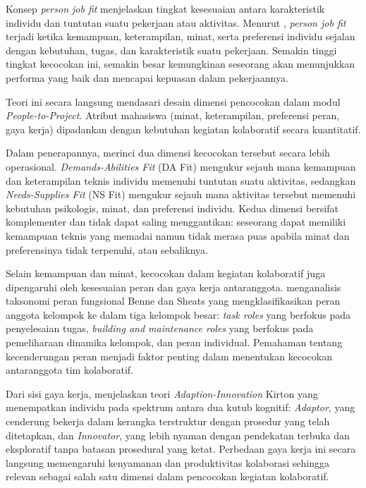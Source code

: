 Konsep \emph{person job fit} menjelaskan tingkat kesesuaian antara karakteristik individu dan tuntutan suatu pekerjaan atau aktivitas. Menurut \textcite{kristofbrown2005}, \emph{person job fit} terjadi ketika kemampuan, keterampilan, minat, serta preferensi individu sejalan dengan kebutuhan, tugas, dan karakteristik suatu pekerjaan. Semakin tinggi tingkat kecocokan ini, semakin besar kemungkinan seseorang akan menunjukkan performa yang baik dan mencapai kepuasan dalam pekerjaannya.

Teori ini secara langsung mendasari desain dimensi pencocokan dalam modul \emph{People-to-Project}. Atribut mahasiswa (minat, keterampilan, preferensi peran, gaya kerja) dipadankan dengan kebutuhan kegiatan kolaboratif secara kuantitatif.

Dalam penerapannya, \textcite{langgeng2021} merinci dua dimensi kecocokan tersebut secara lebih operasional. \emph{Demands-Abilities Fit} (DA Fit) mengukur sejauh mana kemampuan dan keterampilan teknis individu memenuhi tuntutan suatu aktivitas, sedangkan \emph{Needs-Supplies Fit} (NS Fit) mengukur sejauh mana aktivitas tersebut memenuhi kebutuhan psikologis, minat, dan preferensi individu. Kedua dimensi bersifat komplementer dan tidak dapat saling menggantikan: seseorang dapat memiliki kemampuan teknis yang memadai namun tidak merasa puas apabila minat dan preferensinya tidak terpenuhi, atau sebaliknya.

Selain kemampuan dan minat, kecocokan dalam kegiatan kolaboratif juga dipengaruhi oleh kesesuaian peran dan gaya kerja antaranggota. \textcite{burke2019} menganalisis taksonomi peran fungsional Benne dan Sheats yang mengklasifikasikan peran anggota kelompok ke dalam tiga kelompok besar: \emph{task roles} yang berfokus pada penyelesaian tugas, \emph{building and maintenance roles} yang berfokus pada pemeliharaan dinamika kelompok, dan peran individual. Pemahaman tentang kecenderungan peran menjadi faktor penting dalam menentukan kecocokan antaranggota tim kolaboratif.

Dari sisi gaya kerja, \textcite{stum2009} menjelaskan teori \emph{Adaption-Innovation} Kirton yang menempatkan individu pada spektrum antara dua kutub kognitif: \emph{Adaptor}, yang cenderung bekerja dalam kerangka terstruktur dengan prosedur yang telah ditetapkan, dan \emph{Innovator}, yang lebih nyaman dengan pendekatan terbuka dan eksploratif tanpa batasan prosedural yang ketat. Perbedaan gaya kerja ini secara langsung memengaruhi kenyamanan dan produktivitas kolaborasi sehingga relevan sebagai salah satu dimensi dalam pencocokan kegiatan kolaboratif.

